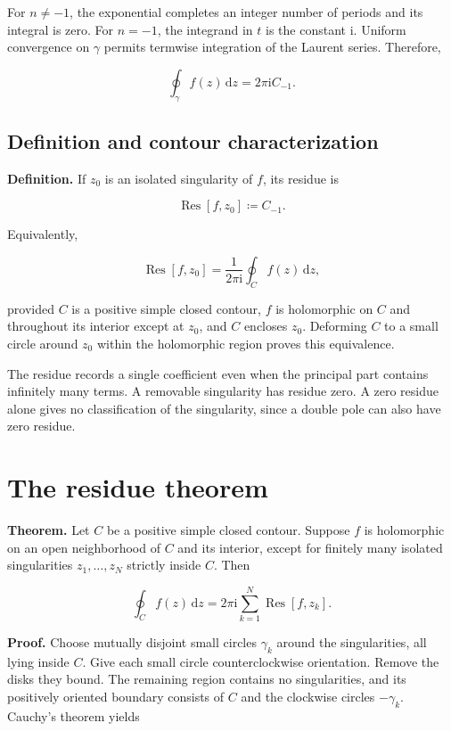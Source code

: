\documentclass[11pt,a4paper]{article}
\theoremstyle{definition}
\theoremstyle{plain}
\begin{document}
For $n\ne-1$, the exponential completes an integer number of periods and its integral is zero. For $n=-1$, the integrand in $t$ is the constant $\mathrm{i}$. Uniform convergence on $\gamma$ permits termwise integration of the Laurent series. Therefore,

\[
\oint_\gamma f(z)\,\mathrm{d}z=2\pi\mathrm{i}C_{-1}.
\]

\subsection{Definition and contour characterization}

\textbf{Definition.} If $z_0$ is an isolated singularity of $f$, its residue is

\[
\operatorname{Res}[f,z_0]\coloneqq C_{-1}.
\]

Equivalently,

\[
\operatorname{Res}[f,z_0]=\frac1{2\pi\mathrm{i}}\oint_C f(z)\,\mathrm{d}z,
\]

provided $C$ is a positive simple closed contour, $f$ is holomorphic on $C$ and throughout its interior except at $z_0$, and $C$ encloses $z_0$. Deforming $C$ to a small circle around $z_0$ within the holomorphic region proves this equivalence.

The residue records a single coefficient even when the principal part contains infinitely many terms. A removable singularity has residue zero. A zero residue alone gives no classification of the singularity, since a double pole can also have zero residue.

\section{The residue theorem}

\textbf{Theorem.} Let $C$ be a positive simple closed contour. Suppose $f$ is holomorphic on an open neighborhood of $C$ and its interior, except for finitely many isolated singularities $z_1,\ldots,z_N$ strictly inside $C$. Then

\[
\oint_C f(z)\,\mathrm{d}z
=2\pi\mathrm{i}\sum_{k=1}^{N}\operatorname{Res}[f,z_k].
\]

\textbf{Proof.} Choose mutually disjoint small circles $\gamma_k$ around the singularities, all lying inside $C$. Give each small circle counterclockwise orientation. Remove the disks they bound. The remaining region contains no singularities, and its positively oriented boundary consists of $C$ and the clockwise circles $-\gamma_k$. Cauchy's theorem yields
\end{document}
